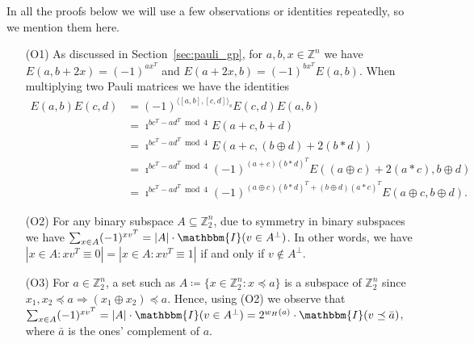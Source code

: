 \documentclass[twoside,romanappendices]{IEEEtran}
\newcommand{\syminn}[2]{\langle #1, #2 \rangle_{\text{s}}}
\begin{document}
In all the proofs below we will use a few observations or identities repeatedly, so we mention them here.
\begin{enumerate}

\item[(O1)] As discussed in Section~\ref{sec:pauli_gp}, for $a,b,x \in \mathbb{Z}^n$ we have $E(a, b + 2x) = (-1)^{ax^T}$ and $E(a + 2x, b) = (-1)^{bx^T} E(a,b)$.
When multiplying two Pauli matrices we have the identities
\begin{align}
E(a,b) E(c,d) & = (-1)^{\syminn{[a,b]}{[c,d]}} E(c,d) E(a,b) \\
   & = \imath^{bc^T - ad^T \bmod 4} E(a+c, b+d) \\
   & = \imath^{bc^T - ad^T \bmod 4} E(a+c, (b \oplus d) + 2 (b \ast d) ) \\
   & = \imath^{bc^T - ad^T \bmod 4} (-1)^{(a + c) (b \ast d)^T} E( (a \oplus c) + 2 (a \ast c), b \oplus d) \\
   & =  \imath^{bc^T - ad^T \bmod 4} (-1)^{(a \oplus c) (b \ast d)^T + (b \oplus d) (a \ast c)^T} E(a \oplus c, b \oplus d).
\end{align}

\item[(O2)] For any binary subspace $A \subseteq \mathbb{Z}_2^n$, due to symmetry in binary subspaces we have $\sum_{x \in A} (-1)^{xv^T} = |A| \cdot \mathbbm{I}(v \in A^{\perp})$.
In other words, we have $|x \in A \colon xv^T \equiv 0| = |x \in A \colon xv^T \equiv 1|$ if and only if $v \notin A^{\perp}$.

\item[(O3)] For $a \in \mathbb{Z}_2^n$, a set such as $A \coloneqq \{ x \in \mathbb{Z}_2^n \colon x \preceq a \}$ is a subspace of $\mathbb{Z}_2^n$ since $x_1, x_2 \preceq a \Rightarrow (x_1 \oplus x_2) \preceq a$.
Hence, using (O2) we observe that $\sum_{x \in A} (-1)^{xv^T} = |A| \cdot \mathbbm{I}(v \in A^{\perp}) = 2^{w_H(a)} \cdot \mathbbm{I}(v \preceq \bar{a})$, where $\bar{a}$ is the ones' complement of $a$.


\end{enumerate}
\end{document}
